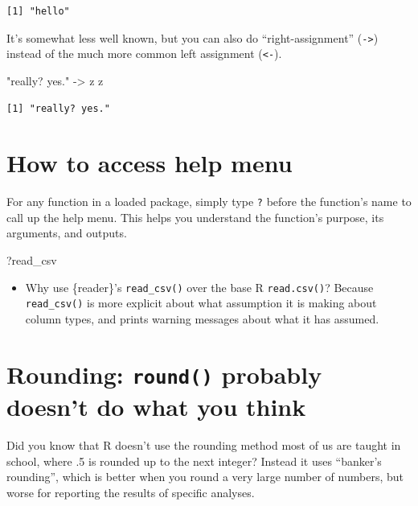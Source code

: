 \documentclass[
  letterpaper,
  DIV=11,
  numbers=noendperiod]{scrreprt}
\newenvironment{Shaded}{\begin{snugshade}}{\end{snugshade}}
\newcommand{\NormalTok}[1]{\textcolor[rgb]{0.00,0.23,0.31}{#1}}
\newcommand{\OtherTok}[1]{\textcolor[rgb]{0.00,0.23,0.31}{#1}}
\newcommand{\StringTok}[1]{\textcolor[rgb]{0.13,0.47,0.30}{#1}}
\providecommand{\tightlist}{%
  \setlength{\itemsep}{0pt}\setlength{\parskip}{0pt}}\usepackage{longtable,booktabs,array}
\begin{document}
\begin{verbatim}
[1] "hello"
\end{verbatim}

It's somewhat less well known, but you can also do ``right-assignment''
(\texttt{-\textgreater{}}) instead of the much more common left
assignment (\texttt{\textless{}-}).

\begin{Shaded}
\begin{Highlighting}[]
\StringTok{"really? yes."} \OtherTok{{-}\textgreater{}}\NormalTok{ z}
\NormalTok{z}
\end{Highlighting}
\end{Shaded}

\begin{verbatim}
[1] "really? yes."
\end{verbatim}

\section{How to access help menu}\label{how-to-access-help-menu}

For any function in a loaded package, simply type \texttt{?} before the
function's name to call up the help menu. This helps you understand the
function's purpose, its arguments, and outputs.

\begin{Shaded}
\begin{Highlighting}[]
\NormalTok{?read\_csv}
\end{Highlighting}
\end{Shaded}

\begin{itemize}
\tightlist
\item
  Why use \{reader\}'s \texttt{read\_csv()} over the base R
  \texttt{read.csv()}? Because \texttt{read\_csv()} is more explicit
  about what assumption it is making about column types, and prints
  warning messages about what it has assumed.
\end{itemize}

\section{\texorpdfstring{Rounding: \texttt{round()} probably doesn't do
what you
think}{Rounding: round() probably doesn't do what you think}}\label{rounding-round-probably-doesnt-do-what-you-think}

Did you know that R doesn't use the rounding method most of us are
taught in school, where .5 is rounded up to the next integer? Instead it
uses ``banker's rounding'', which is better when you round a very large
number of numbers, but worse for reporting the results of specific
analyses.
\end{document}
